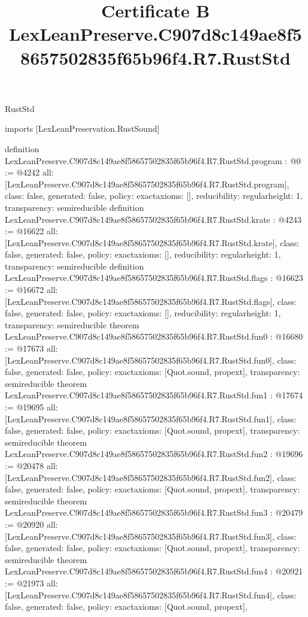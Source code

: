 \begin{lexlean}{RustStd}
\title{Certificate B LexLeanPreserve.C907d8c149ae8f58657502835f65b96f4.R7.RustStd}
\begin{coremodule}
imports [LexLeanPreservation.RustSound]

definition LexLeanPreserve.C907d8c149ae8f58657502835f65b96f4.R7.RustStd.program : @0 := @4242 {
  all: [LexLeanPreserve.C907d8c149ae8f58657502835f65b96f4.R7.RustStd.program],
  class: false,
  generated: false,
  policy: exact{axioms: []},
  reducibility: regular{height: 1},
  transparency: semireducible
}
definition LexLeanPreserve.C907d8c149ae8f58657502835f65b96f4.R7.RustStd.krate : @4243 := @16622 {
  all: [LexLeanPreserve.C907d8c149ae8f58657502835f65b96f4.R7.RustStd.krate],
  class: false,
  generated: false,
  policy: exact{axioms: []},
  reducibility: regular{height: 1},
  transparency: semireducible
}
definition LexLeanPreserve.C907d8c149ae8f58657502835f65b96f4.R7.RustStd.flags : @16623 := @16672 {
  all: [LexLeanPreserve.C907d8c149ae8f58657502835f65b96f4.R7.RustStd.flags],
  class: false,
  generated: false,
  policy: exact{axioms: []},
  reducibility: regular{height: 1},
  transparency: semireducible
}
theorem LexLeanPreserve.C907d8c149ae8f58657502835f65b96f4.R7.RustStd.fun0 : @16680 := @17673 {
  all: [LexLeanPreserve.C907d8c149ae8f58657502835f65b96f4.R7.RustStd.fun0],
  class: false,
  generated: false,
  policy: exact{axioms: [Quot.sound, propext]},
  transparency: semireducible
}
theorem LexLeanPreserve.C907d8c149ae8f58657502835f65b96f4.R7.RustStd.fun1 : @17674 := @19695 {
  all: [LexLeanPreserve.C907d8c149ae8f58657502835f65b96f4.R7.RustStd.fun1],
  class: false,
  generated: false,
  policy: exact{axioms: [Quot.sound, propext]},
  transparency: semireducible
}
theorem LexLeanPreserve.C907d8c149ae8f58657502835f65b96f4.R7.RustStd.fun2 : @19696 := @20478 {
  all: [LexLeanPreserve.C907d8c149ae8f58657502835f65b96f4.R7.RustStd.fun2],
  class: false,
  generated: false,
  policy: exact{axioms: [Quot.sound, propext]},
  transparency: semireducible
}
theorem LexLeanPreserve.C907d8c149ae8f58657502835f65b96f4.R7.RustStd.fun3 : @20479 := @20920 {
  all: [LexLeanPreserve.C907d8c149ae8f58657502835f65b96f4.R7.RustStd.fun3],
  class: false,
  generated: false,
  policy: exact{axioms: [Quot.sound, propext]},
  transparency: semireducible
}
theorem LexLeanPreserve.C907d8c149ae8f58657502835f65b96f4.R7.RustStd.fun4 : @20921 := @21973 {
  all: [LexLeanPreserve.C907d8c149ae8f58657502835f65b96f4.R7.RustStd.fun4],
  class: false,
  generated: false,
  policy: exact{axioms: [Quot.sound, propext]},
}
\end{coremodule}
\end{lexlean}
